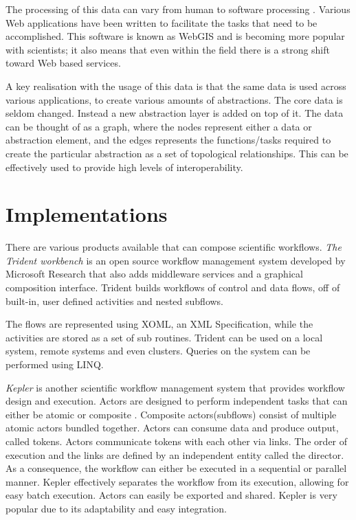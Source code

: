 \documentclass[12pt,a4paper]{report}
\begin{document}
The processing of this data can vary from human to software processing
\cite{DiMartino:2007:TAG:1341012.1341081}.  Various Web applications have been
written to facilitate the tasks that need to be accomplished.  This software is
known as WebGIS and is becoming more popular with scientists; it also means
that even within the field there is a strong shift toward Web based services.

A key realisation with the usage of this data is that the same data is used
across various applications, to create various amounts of
abstractions\cite{ElAdnani:2001:MLF:512161.512177}.  The core data is seldom
changed. Instead a new abstraction layer is added on top of it. The data can be
thought of as a graph, where the nodes represent either a data or abstraction
element, and the edges represents the functions/tasks required to create the
particular abstraction as a set of topological relationships. This can be
effectively used to provide high levels of interoperability.

\section{Implementations}
There are various products available that can compose scientific workflows.
\emph{The Trident workbench} \cite{Simmhan:2009:BTS:1673063.1673121} is an open
source workflow management system developed by Microsoft Research that also
adds middleware services and a graphical composition interface. Trident builds
workflows of control and data flows, off of built-in, user defined activities
and nested subflows.

The flows are represented using XOML, an XML Specification, while the
activities are stored as a set of sub routines\cite{Simmhan2011790}. Trident
can be used on a local system, remote systems and even clusters.  Queries on
the system can be performed using LINQ.


\emph{Kepler} is another scientific workflow management system that
provides workflow design and execution.  Actors are designed to perform
independent tasks that can either be atomic or  composite
\cite{Wang:2009:KHG:1645164.1645176}.  Composite actors(subflows) consist of
multiple   atomic actors bundled together. Actors can consume data and produce
output, called tokens. Actors communicate tokens with each other via links. The
order of execution and the links are defined by an independent entity called
the director. As a consequence, the workflow can either be executed in a
sequential or parallel manner. Kepler effectively separates the workflow from
its execution, allowing for easy batch execution. Actors can easily be exported
and shared.  Kepler is very popular due to its adaptability and easy
integration.
\end{document}
